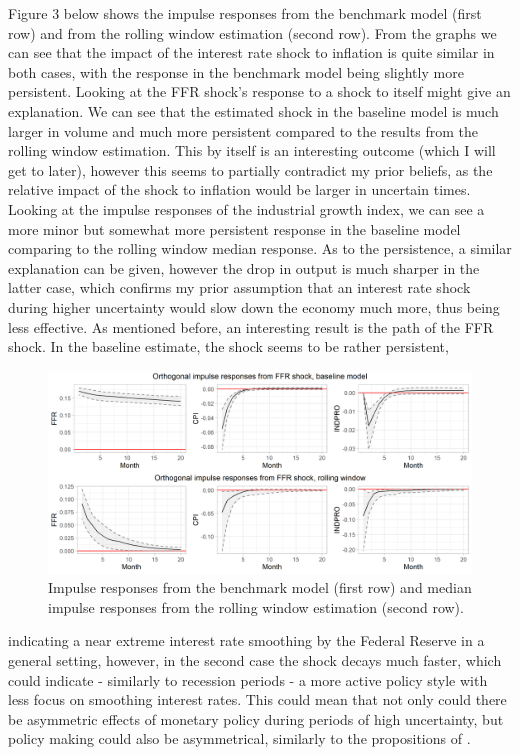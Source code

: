 \documentclass[12pt,a4paper]{article}
\begin{document}
Figure 3 below shows the impulse responses from the benchmark model (first row) and from the rolling window estimation (second row). From the graphs we can see that the impact of the interest rate shock to inflation is quite similar in both cases, with the response in the benchmark model being slightly more persistent. Looking at the FFR shock's response to a shock to itself might give an explanation. We can see that the estimated shock in the baseline model is much larger in volume and much more persistent compared to the results from the rolling window estimation. This by itself is an interesting outcome (which I will get to later), however this seems to partially contradict my prior beliefs, as the relative impact of the shock to inflation would be larger in uncertain times. Looking at the impulse responses of the industrial growth index, we can see a more minor but somewhat more persistent response in the baseline model comparing to the rolling window median response. As to the persistence, a similar explanation can be given, however the drop in output is much sharper in the latter case, which confirms my prior assumption that an interest rate shock during higher uncertainty would slow down the economy much more, thus being less effective. As mentioned before, an interesting result is the path of the FFR shock. In the baseline estimate, the shock seems to be rather persistent, 

\begin{center}
\begin{figure}[h!]
	\includegraphics[width=0.9\linewidth]{irfplot1.png}
			\caption{Impulse responses from the benchmark model (first row) and median impulse responses from the rolling window estimation (second row).}
\end{figure}
\end{center}
\noindent indicating a near extreme interest rate smoothing by the Federal Reserve in a general setting, however, in the second case the shock decays much faster, which could indicate - similarly to recession periods - a more active policy style with less focus on smoothing interest rates. This could mean that not only could there be asymmetric effects of monetary policy during periods of high uncertainty, but policy making could also be asymmetrical, similarly to the propositions of \textcolor{blue}{\cite{doi:10.1080/1331677X.2018.1481445}}.\\
\end{document}
